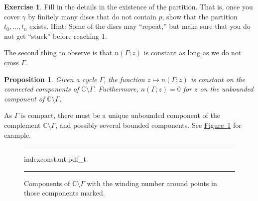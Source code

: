 \documentclass[12pt,openany]{book}
\newcommand{\C}{{\mathbb{C}}}
\newcommand{\myquote}[1]{``#1''}
\theoremstyle{plain}
\newtheorem{prop}[thm]{Proposition}
\theoremstyle{remark}
\theoremstyle{definition}
\newenvironment{exbox}{%
    \def\FrameCommand{\vrule width 1pt \relax\hspace{10pt}}%
    \MakeFramed{\advance\hsize-\width\FrameRestore}%
}{%
    \endMakeFramed
}
\newenvironment{myfig}{%
\begin{figure}[h!t]
\noindent\rule{\textwidth}{0.5pt}\vspace{12pt}\par\centering}%
{\par\noindent\rule{\textwidth}{0.5pt}
\end{figure}}
\theoremstyle{exercise}
\newtheorem{exercise}{Exercise}[section]
\theoremstyle{example}
\newcommand{\figureref}[1]{\hyperref[#1]{Figure~\ref*{#1}}}
\begin{document}
\begin{exbox}
\begin{exercise}
Fill in the details in the existence of the partition.  That is, once you
cover $\gamma$ by finitely many discs that do not contain $p$, show that
the partition $t_0,\ldots,t_n$ exists.  Hint: Some of the discs may
\myquote{repeat,} but make sure that you do not get \myquote{stuck}
before reaching $1$.
\end{exercise}
\end{exbox}

The second thing to observe is that $n(\Gamma;z)$ is constant as long as we
do not cross $\Gamma$.

\begin{prop} \label{prop:windingconstant}
Given a cycle $\Gamma$,
the function $z \mapsto n(\Gamma;z)$ is constant on the
connected components of $\C \setminus \Gamma$.
Furthermore, $n(\Gamma;z) = 0$ for $z$ on the unbounded component
of $\C \setminus \Gamma$.
\end{prop}

As $\Gamma$ is compact, there must be a unique unbounded component
of the complement $\C \setminus \Gamma$, and possibly several bounded
components.
See \figureref{fig:indexconstant} for example.

\begin{myfig}
{indexconstant.pdf_t}
\caption{Components of $\C \setminus \Gamma$ with the 
winding number around points in those components
marked.\label{fig:indexconstant}}
\end{myfig}
\end{document}
